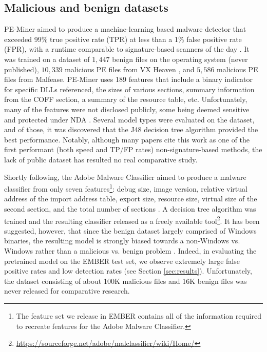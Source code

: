 \subsection{Malicious and benign datasets}
\label{sec:datasets}
PE-Miner aimed to produce a machine-learning based malware detector that exceeded 99\% true positive rate (TPR) at less than a 1\% false positive rate (FPR), with a runtime comparable to signature-based scanners of the day \cite{shafiq2009pe}.  It was trained on a dataset of $1,447$ benign files on the operating system (never published), $10,339$ malicious PE files from VX Heaven \cite{vxheaven}, and $5,586$ malicious PE files from Malfease.  PE-Miner uses 189 features that include a binary indicator for specific DLLs referenced, the sizes of various sections, summary information from the COFF section, a summary of the resource table, etc.  Unfortunately, many of the features were not disclosed publicly, some being deemed sensitive and protected under NDA \cite{seymour2016howto}.  Several model types were evaluated on the dataset, and of those, it was discovered that the J48 decision tree algorithm provided the best performance.  Notably, although many papers cite this work as one of the first performant (both speed and TP/FP rates) non-signature-based methods, the lack of public dataset has resulted no real comparative study.

Shortly following, the Adobe Malware Classifier aimed to produce a malware classifier from only seven features\footnote{The feature set we release in EMBER contains all of the information required to recreate features for the Adobe Malware Classifier.}: debug size, image version, relative virtual address of the import address table, export size, resource size, virtual size of the second section, and the total number of sections \cite{raman2012selecting}. A decision tree algorithm was trained and the resulting classifier released as a freely available tool\footnote{\url{https://sourceforge.net/adobe/malclassifier/wiki/Home/}}.  It has been suggested, however, that since the benign dataset largely comprised of Windows binaries, the resulting model is strongly biased towards a non-Windows vs. Windows rather than a malicious vs. benign problem \cite{seymour2016howto}. Indeed, in evaluating the pretrained model on the EMBER test set, we observe extremely large false positive rates and low detection rates (see Section \ref{sec:results}). Unfortunately, the dataset consisting of about 100K malicious files and 16K benign files was never released for comparative research.  


